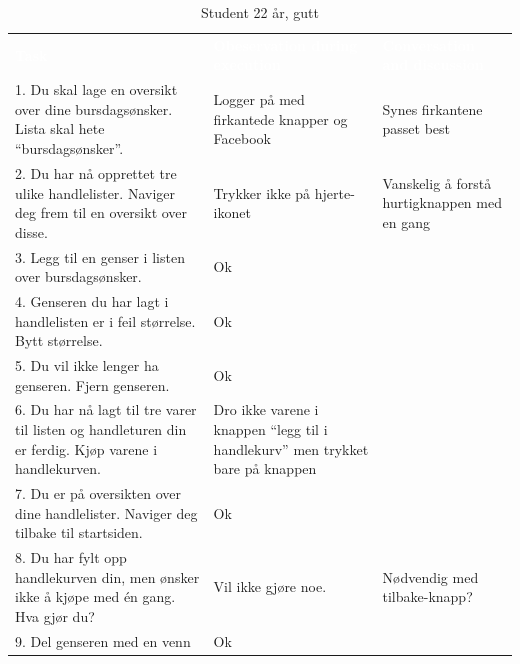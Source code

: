 \begin{table}[H]
    \caption{Student 22 år, gutt}
    \label{tab:observasjon2_2}
    \centering
    \begin{tabular}{L{15em}  L{15em} L{15em}}
        \textbf{\textcolor{white}{Task}} & \textbf{\textcolor{white}{Obeservation during execution}} & \textbf{\textcolor{white}{Conversation and discussion}}\\
        1. Du skal lage en oversikt over dine bursdagsønsker. Lista skal hete “bursdagsønsker”. & Logger på med firkantede knapper og Facebook & Synes firkantene passet best\\
        2. Du har nå opprettet tre ulike handlelister. Naviger deg frem til en oversikt over disse. & Trykker ikke på hjerte-ikonet & Vanskelig å forstå hurtigknappen med en gang \\
        3. Legg til en genser i listen over bursdagsønsker. & Ok & \\ 
        4. Genseren du har lagt i handlelisten er i feil størrelse. Bytt størrelse. & Ok & \\
        5. Du vil ikke lenger ha genseren. Fjern genseren. & Ok & \\
        6. Du har nå lagt til tre varer til listen og handleturen din er ferdig. Kjøp varene i handlekurven. & Dro ikke varene i knappen “legg til i handlekurv” men trykket bare på knappen & \\
        7. Du er på oversikten over dine handlelister. Naviger deg tilbake til startsiden. & Ok & \\
        8. Du har fylt opp handlekurven din, men ønsker ikke å kjøpe med én gang. Hva gjør du? & Vil ikke gjøre noe. & Nødvendig med tilbake-knapp?\\
        9. Del genseren med en venn & Ok & \\
    \end{tabular}
\end{table}

